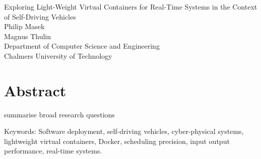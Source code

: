 Exploring Light-Weight Virtual Containers for Real-Time Systems in the Context of Self-Driving Vehicles\\
Philip Masek\\
Magnus Thulin\\
Department of Computer Science and Engineering\\
Chalmers University of Technology \setlength{\parskip}{0.5cm}

\thispagestyle{plain}			%
\setlength{\parskip}{0pt plus 1.0pt}
\section*{Abstract}

summarise broad research questions




\vfill
Keywords: Software deployment, self-driving vehicles, cyber-physical systems, lightweight virtual containers, Docker, scheduling precision, input output performance, real-time systems.

\newpage				%
\thispagestyle{empty}
\mbox{}